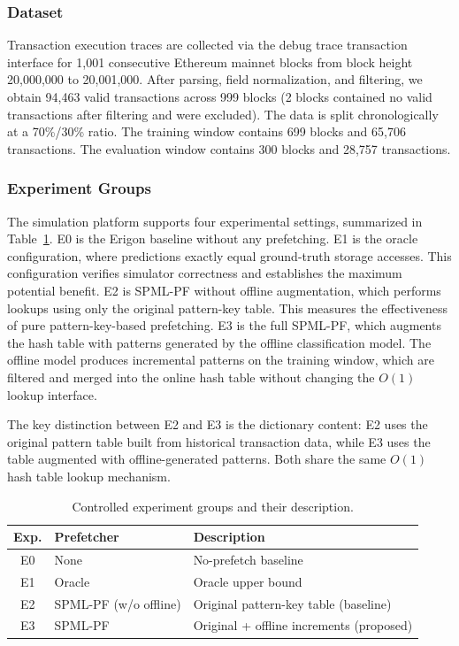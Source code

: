 \documentclass[conference]{IEEEtran}
\begin{document}
\subsubsection{Dataset}

Transaction execution traces are collected via the debug trace transaction interface for 1,001 consecutive Ethereum mainnet blocks from block height 20,000,000 to 20,001,000. After parsing, field normalization, and filtering, we obtain 94,463 valid transactions across 999 blocks (2 blocks contained no valid transactions after filtering and were excluded). The data is split chronologically at a 70\%/30\% ratio. The training window contains 699 blocks and 65,706 transactions. The evaluation window contains 300 blocks and 28,757 transactions.

\subsubsection{Experiment Groups}

The simulation platform supports four experimental settings, summarized in Table~\ref{tab:experiments}. E0 is the Erigon baseline without any prefetching. E1 is the oracle configuration, where predictions exactly equal ground-truth storage accesses. This configuration verifies simulator correctness and establishes the maximum potential benefit. E2 is SPML-PF without offline augmentation, which performs lookups using only the original pattern-key table. This measures the effectiveness of pure pattern-key-based prefetching. E3 is the full SPML-PF, which augments the hash table with patterns generated by the offline classification model. The offline model produces incremental patterns on the training window, which are filtered and merged into the online hash table without changing the $O(1)$ lookup interface.

The key distinction between E2 and E3 is the dictionary content: E2 uses the original pattern table built from historical transaction data, while E3 uses the table augmented with offline-generated patterns. Both share the same $O(1)$ hash table lookup mechanism.

\begin{table}[t]
\caption{Controlled experiment groups and their description.}
\label{tab:experiments}
\begin{center}
\begin{tabular}{cll}
\toprule
\textbf{Exp.} & \textbf{Prefetcher} & \textbf{Description} \\
\midrule
E0 & None & No-prefetch baseline \\
E1 & Oracle & Oracle upper bound \\
E2 & SPML-PF (w/o offline) & Original pattern-key table (baseline) \\
E3 & SPML-PF & Original + offline increments (proposed) \\
\bottomrule
\end{tabular}
\end{center}
\end{table}
\end{document}
